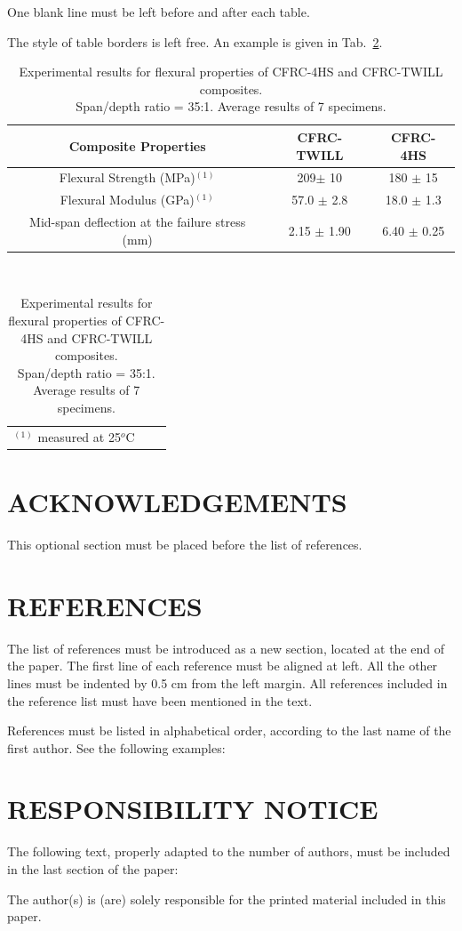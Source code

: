 \documentclass[10pt,fleqn,a4paper,twoside]{article}
\begin{document}
One blank line must be left before and after each table.

The style of table borders is left free. An example is given in Tab.~\ref{tab1}.
\begin{table}[!h]
\centering
\caption{Experimental results for flexural properties of CFRC-4HS and CFRC-TWILL composites. \protect\\Span/depth ratio = 35:1. Average results of 7 specimens.}
\begin{tabular}{|c|c|c|}
\hline
Composite Properties & CFRC-TWILL & CFRC-4HS\\
\hline
Flexural Strength (MPa)$^{(1)}$ & 209$\pm$ 10 & 180 $\pm$  15\\
\hline
Flexural Modulus (GPa)$^{(1)}$ & 57.0 $\pm$ 2.8 & 18.0 $\pm$  1.3\\
\hline
Mid-span deflection at the failure stress (mm) & 2.15 $\pm$  1.90 & 6.40 $\pm$  0.25\\
\hline
\end{tabular}
\\
\begin{tabular}{p{11cm}ll}
$^{(1)}$ measured at 25$^{o}$C & &
\end{tabular}
\label{tab1}
\end{table}

\section{ACKNOWLEDGEMENTS}
This optional section must be placed before the list of references.

\section{REFERENCES} 

The list of references must be introduced as a new section, located at the end of the paper. The first line of each reference must be aligned at left.  All the other lines must be indented by 0.5 cm from the left margin. All references included in the reference list must have been mentioned in the text.

References must be listed in alphabetical order, according to the last name of the first author. See the following examples:


\renewcommand{\refname}{}


\section{RESPONSIBILITY NOTICE}

The following text, properly adapted to the number of authors, must be included in the last section of the paper:

The author(s) is (are) solely responsible for the printed material included in this paper.
\end{document}
